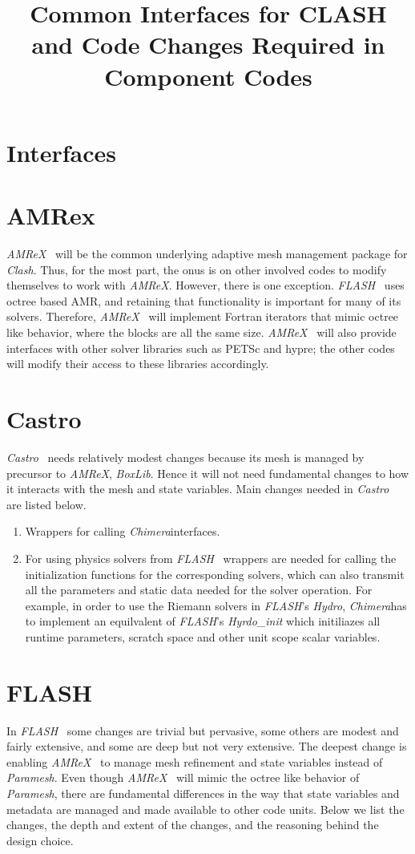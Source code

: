 \documentclass{article}
\title{Common Interfaces for CLASH and Code Changes Required in
Component Codes}
\newcommand{\flash}{{\it FLASH}}
\newcommand{\amrex}{{\it AMReX}}
\newcommand{\paramesh}{{\it Paramesh}}
\newcommand{\castro}{{\it Castro}}
\newcommand{\clash}{{\it Clash}}
\newcommand{\chimera}{{\it Chimera}}
\begin{document}
\maketitle


\section{Interfaces}
\label{sec:interfaces}

\section{AMRex}
\label{sec:amrex}
\amrex~ will be the common underlying adaptive mesh management package
for \clash. Thus, for the most part, the onus is on other involved
codes to modify themselves to work with \amrex. However, there is one
exception. \flash~ uses octree based AMR, and retaining that
functionality is important for many of its solvers. Therefore, \amrex~
will implement Fortran iterators that mimic octree like behavior,
where the blocks are all the same size. \amrex~ will also provide
interfaces with other solver libraries such as PETSc and hypre; the
other codes will modify their access to these libraries accordingly.

\section{Castro}
\label{sec:castro}
\castro~ needs relatively modest changes because its mesh is managed by
precursor to \amrex, {\it BoxLib}. Hence it will not need fundamental
changes to how it interacts with the mesh and state variables. Main
changes needed in \castro~ are listed below.
\begin{enumerate}
\item Wrappers for calling \chimera  interfaces.
\item For using physics solvers from \flash~ wrappers are needed for
calling the initialization functions for the corresponding solvers,
which can also transmit all the parameters and static data needed for
the solver operation. For example, in order to use the Riemann solvers
in \flash's {\it Hydro}, \chimera has to implement an equilvalent of
\flash's {\it Hyrdo\_init} which initiliazes all runtime parameters, 
scratch space and other unit scope scalar variables.
\end{enumerate}

\section{FLASH}
\label{sec:flash}
 In \flash~ some changes are trivial but pervasive, some others are
modest and fairly extensive, and some are deep but not very
extensive. The deepest change is enabling \amrex~ to manage mesh
refinement and state variables instead of \paramesh. Even though
\amrex~ will mimic the octree like behavior of \paramesh, there are
fundamental differences in the way that state variables and metadata
are managed and made available to other code units. Below we list the
changes, the depth and extent of the changes, and the reasoning behind
the design choice.
\end{document}
